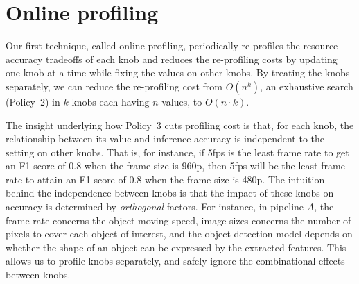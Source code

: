 \section{Online profiling}
\label{sec:online}

Our first technique, called online profiling, periodically re-profiles 
the resource-accuracy tradeoffs of each knob and reduces the 
re-profiling costs by updating one knob at a time while fixing the 
values on other knobs.
By treating the knobs separately, we can reduce the re-profiling cost 
from $O(n^k)$, an exhaustive search (Policy~2) in $k$ knobs each having 
$n$ values, to $O(n\cdot k)$.


The insight underlying how Policy~3 cuts profiling cost is that, for
each knob, the relationship between its value and inference accuracy is 
independent to the setting on other knobs. 
That is, for instance, if 5fps is the least frame rate to get an F1 score
of 0.8 when the frame size is 960p, then 5fps will be the least frame rate 
to attain an F1 score of 0.8 when the frame size is 480p.
The intuition behind the independence between knobs is that the impact of
these knobs on accuracy is determined by {\em orthogonal} factors. 
For instance, in pipeline $A$, the frame rate concerns the object moving
speed, image sizes concerns the number of pixels to cover each object of
interest, and the object detection model depends on whether the shape of
an object can be expressed by the extracted features.
This allows us to profile knobs separately, and safely ignore the 
combinational effects between knobs.


